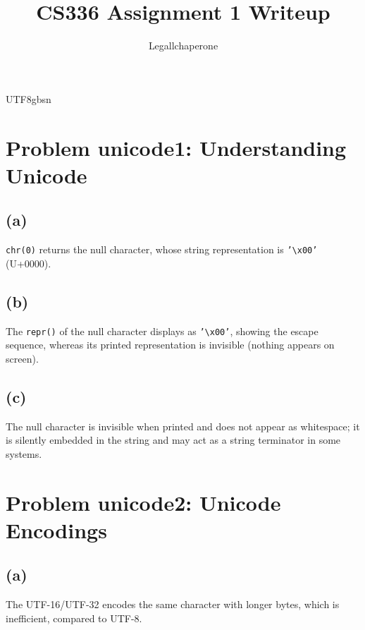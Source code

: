 \documentclass{article}
\title{CS336 Assignment 1 Writeup}
\author{Legallchaperone}
\date{}
\newcommand{\code}[1]{\texttt{#1}}
\begin{document}
\begin{CJK}{UTF8}{gbsn}

\maketitle

\section*{Problem unicode1: Understanding Unicode}

\subsection*{(a)}
\code{chr(0)} returns the null character, whose string representation
is \code{'\textbackslash x00'} (U+0000).

\subsection*{(b)}
The \code{repr()} of the null character displays as \code{'\textbackslash x00'},
showing the escape sequence, whereas its printed representation is invisible
(nothing appears on screen).

\subsection*{(c)}
The null character is invisible when printed and does not appear as whitespace;
it is silently embedded in the string and may act as a string terminator
in some systems.

\section*{Problem unicode2: Unicode Encodings}

\subsection*{(a)}
The UTF-16/UTF-32 encodes the same character with longer bytes, which is inefficient, compared to UTF-8.


\end{CJK}
\end{document}
